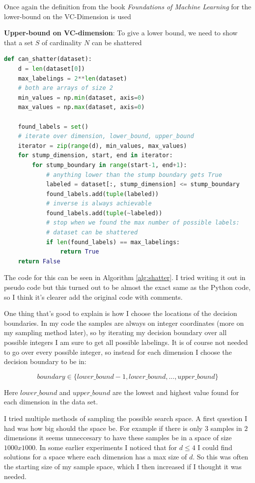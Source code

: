 \documentclass[11pt,a4paper]{article}
\begin{document}
Once again the definition from the book \textit{Foundations of Machine Learning} \cite{foundations_of_machine_learning} for the lower-bound on the VC-Dimension is used

\textbf{Upper-bound on VC-dimension}: To give a lower bound, we need to show that a set $S$ of cardinality $N$ can be shattered

\begin{lstlisting}[language=Python, caption=Can Shatter Method, label={alg:shatter}]
def can_shatter(dataset):
    d = len(dataset[0])
    max_labelings = 2**len(dataset)
    # both are arrays of size 2
    min_values = np.min(dataset, axis=0)
    max_values = np.max(dataset, axis=0)

    found_labels = set()
    # iterate over dimension, lower_bound, upper_bound
    iterator = zip(range(d), min_values, max_values)
    for stump_dimension, start, end in iterator:
        for stump_boundary in range(start-1, end+1):
            # anything lower than the stump boundary gets True
            labeled = dataset[:, stump_dimension] <= stump_boundary
            found_labels.add(tuple(labeled))
            # inverse is always achievable
            found_labels.add(tuple(~labeled))
            # stop when we found the max number of possible labels:
            # dataset can be shattered
            if len(found_labels) == max_labelings:
                return True
    return False
\end{lstlisting}

The code for this can be seen in Algorithm \ref{alg:shatter}. I tried writing it out in pseudo code but this turned out to be almost the exact same as the Python code, so I think it's clearer add the original code with comments.

One thing that's good to explain is how I choose the locations of the decision boundaries. In my code the samples are always on integer coordinates (more on my sampling method later), so by iterating my decision boundary over all possible integers I am sure to get all possible labelings. It is of course not needed to go over every possible integer, so instead for each dimension I choose the decision boundary to be in:

\[ boundary \in \{lower\_bound - 1, lower\_bound, ..., upper\_bound\} \]

Here $lower\_bound$ and $upper\_bound$ are the lowest and highest value found for each dimension in the data set. 

I tried multiple methods of sampling the possible search space. A first question I had was how big should the space be. For example if there is only $3$ samples in $2$ dimensions it seems unneccesary to have these samples be in a space of size $1000x1000$. In some earlier experiments I noticed that for $d \leq 4$ I could find solutions for a space where each dimension has a max size of $d$. So this was often the starting size of my sample space, which I then increased if I thought it was needed.
\end{document}
